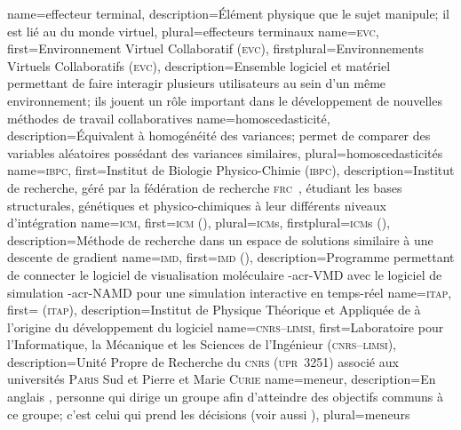 {%
	name={effecteur terminal},%
	description={Élément physique que le sujet manipule; il est lié au  du monde virtuel},%
	plural={effecteurs terminaux}%
}
%
{%
	name={\textsc{evc}},%
	first={Environnement Virtuel Collaboratif (\textsc{evc})},%
	firstplural={Environnements Virtuels Collaboratifs (\textsc{evc})},%
	description={Ensemble logiciel et matériel permettant de faire interagir plusieurs utilisateurs au sein d'un même environnement; ils jouent un rôle important dans le développement de nouvelles méthodes de travail collaboratives}%
}
%
{%
	name={homoscedasticité},%
	description={Équivalent à homogénéité des variances; permet de comparer des variables aléatoires possédant des variances similaires},%
	plural={homoscedasticités}%
}
%
{%
	name={\textsc{ibpc}},%
	first={Institut de Biologie Physico-Chimie (\textsc{ibpc})},%
	description={Institut de recherche, géré par la fédération de recherche \textsc{frc}~, étudiant les bases structurales, génétiques et physico-chimiques à leur différents niveaux d'intégration}%
}
%
{%
	name={\textsc{icm}},
	first={\textsc{icm} ()},%
	plural={\textsc{icm}s},%
	firstplural={\textsc{icm}s ()},%
	description={Méthode de recherche dans un espace de solutions similaire à une descente de gradient}
}
%
{%
	name={\textsc{imd}},%
	first={\textsc{imd} ()},%
	description={Programme permettant de connecter le logiciel de visualisation moléculaire \myacro-{acr-VMD} avec le logiciel de simulation \myacro-{acr-NAMD} pour une simulation interactive en temps-réel }%
}
%
{%
	name={\textsc{itap}},%
	first={ (\textsc{itap})},%
	description={Institut de Physique Théorique et Appliquée de  à l'origine du développement du logiciel }%
}
%
{%
	name={\textsc{cnrs--limsi}},%
	first={Laboratoire pour l'Informatique, la Mécanique et les Sciences de l'Ingénieur (\textsc{cnrs--limsi})},%
	description={Unité Propre de Recherche du \textsc{cnrs} (\textsc{upr}~3251) associé aux universités \textsc{Paris} Sud et Pierre et Marie \textsc{Curie}}%
}
%
{%
	name={meneur},%
	description={En anglais , personne qui dirige un groupe afin d'atteindre des objectifs communs à ce groupe; c'est celui qui prend les décisions (voir aussi )},%
	plural={meneurs}%
}
